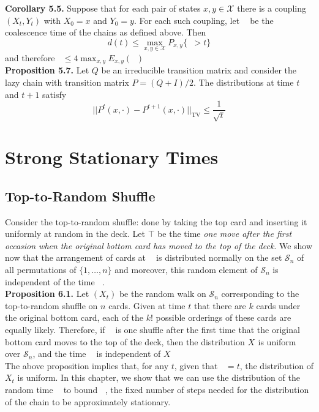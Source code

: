 \documentclass[12pt]{article}
\DeclareMathOperator*{\TV}{\text{TV}}
\DeclareMathOperator*{\mix}{t_{\text{mix}}}
\DeclareMathOperator*{\couple}{\tau_{\text{couple}}}
\DeclareMathOperator*{\ttop}{\tau_{\text{top}}}
\begin{document}
\textbf{Corollary 5.5.} Suppose that for each pair of states $x, y \in \mathcal{X}$ there is a coupling $(X_t, Y_t)$ with $X_0 = x$ and $Y_0 = y$. For each such coupling, let $\couple$ be the coalescence time of the chains as defined above. Then $$d(t) \leq \max_{x, y \in \mathcal{X}} P_{x,y} \{\couple > t\}$$ and therefore $\mix \leq 4 \max_{x,y} E_{x,y}(\couple)$\\

\textbf{Proposition 5.7.} Let $Q$ be an irreducible transition matrix and consider the lazy chain with transition matrix $P = (Q+I)/2$. The distributions at time $t$ and $t+1$ satisfy $$||P^t(x, \cdot) - P^{t+1}(x, \cdot)||_{\TV} \leq \frac{1}{\sqrt{t}}$$


\section{Strong Stationary Times}

\subsection{Top-to-Random Shuffle}

Consider the top-to-random shuffle: done by taking the top card and inserting it uniformly at random in the deck. Let $\top$ be the time \textit{one move after the first occasion when the original bottom card has moved to the top of the deck}. We show now that the arrangement of cards at $\ttop$ is distributed normally on the set $\mathcal{S}_n$ of all permutations of $\{1, \ldots, n\}$ and moreover, this random element of $\mathcal{S}_n$ is independent of the time $\ttop$.\\

\textbf{Proposition 6.1.} Let $(X_t)$ be the random walk on $\mathcal{S}_n$ corresponding to the top-to-random shuffle on $n$ cards. Given at time $t$ that there are $k$ cards under the original bottom card, each of the $k!$ possible orderings of these cards are equally likely. Therefore, if $\ttop$ is one shuffle after the first time that the original bottom card moves to the top of the deck, then the distribution $X_{\ttop}$ is uniform over $\mathcal{S}_n$, and the time $\ttop$ is independent of $X_{\ttop}$\\

The above proposition implies that, for any $t$, given that $\ttop = t$, the distribution of $X_t$ is uniform. In this chapter, we show that we can use the distribution of the random time $\ttop$ to bound $\mix$, the fixed number of steps needed for the distribution of the chain to be approximately stationary.
\end{document}

